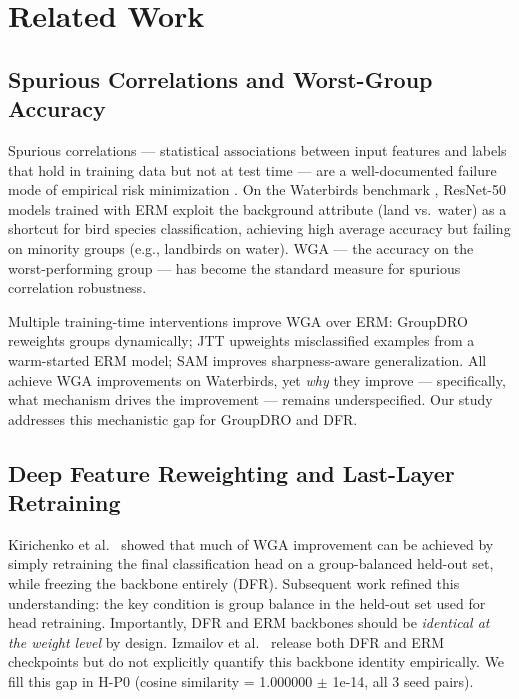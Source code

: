 \section{Related Work}
\label{sec:related}

\subsection{Spurious Correlations and Worst-Group Accuracy}

Spurious correlations --- statistical associations between input features and labels that hold in training data but not at test time --- are a well-documented failure mode of empirical risk minimization \cite{sagawa2019distributionally}. On the Waterbirds benchmark \cite{sagawa2019distributionally}, ResNet-50 models trained with ERM exploit the background attribute (land vs.\ water) as a shortcut for bird species classification, achieving high average accuracy but failing on minority groups (e.g., landbirds on water). WGA --- the accuracy on the worst-performing group --- has become the standard measure for spurious correlation robustness.

Multiple training-time interventions improve WGA over ERM: GroupDRO \cite{sagawa2019distributionally} reweights groups dynamically; JTT \cite{liu2021just} upweights misclassified examples from a warm-started ERM model; SAM \cite{foret2021sharpness} improves sharpness-aware generalization. All achieve WGA improvements on Waterbirds, yet \emph{why} they improve --- specifically, what mechanism drives the improvement --- remains underspecified. Our study addresses this mechanistic gap for GroupDRO and DFR.

\subsection{Deep Feature Reweighting and Last-Layer Retraining}

Kirichenko et al.\ \cite{kirichenko2022last} showed that much of WGA improvement can be achieved by simply retraining the final classification head on a group-balanced held-out set, while freezing the backbone entirely (DFR). Subsequent work \cite{labonte2023last,hill2025unreasonable} refined this understanding: the key condition is group balance in the held-out set used for head retraining. Importantly, DFR and ERM backbones should be \emph{identical at the weight level} by design. Izmailov et al.\ \cite{izmailov2022feature} release both DFR and ERM checkpoints but do not explicitly quantify this backbone identity empirically. We fill this gap in H-P0 (cosine similarity = 1.000000 $\pm$ 1e-14, all 3 seed pairs).

